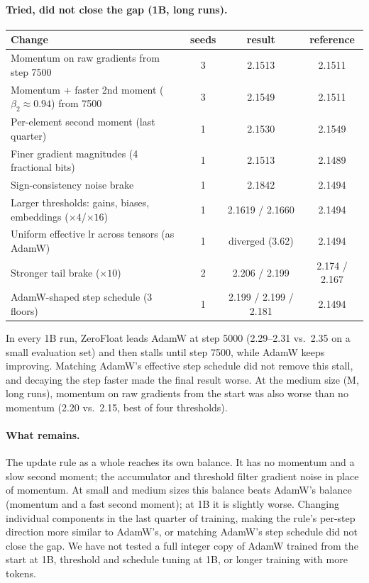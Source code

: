 \documentclass[11pt]{article}
\begin{document}
\paragraph{Tried, did not close the gap (1B, long runs).}
\begin{center}\small
\begin{tabular}{lccc}\toprule
Change & seeds & result & reference \\\midrule
Momentum on raw gradients from step 7500 & 3 & 2.1513 & 2.1511 \\
Momentum + faster 2nd moment ($\beta_2\!\approx\!0.94$) from 7500 & 3 & 2.1549 & 2.1511 \\
Per-element second moment (last quarter) & 1 & 2.1530 & 2.1549 \\
Finer gradient magnitudes (4 fractional bits) & 1 & 2.1513 & 2.1489 \\
Sign-consistency noise brake & 1 & 2.1842 & 2.1494 \\
Larger thresholds: gains, biases, embeddings ($\times4$/$\times16$) & 1 & 2.1619 / 2.1660 & 2.1494 \\
Uniform effective lr across tensors (as AdamW) & 1 & diverged (3.62) & 2.1494 \\
Stronger tail brake ($\times10$) & 2 & 2.206 / 2.199 & 2.174 / 2.167 \\
AdamW-shaped step schedule (3 floors) & 1 & 2.199 / 2.199 / 2.181 & 2.1494 \\\bottomrule
\end{tabular}
\end{center}
In every 1B run, ZeroFloat leads AdamW at step 5000 (2.29--2.31 vs.\ 2.35 on a small evaluation set) and then stalls until step 7500, while AdamW keeps improving. Matching AdamW's effective step schedule did not remove this stall, and decaying the step faster made the final result worse. At the medium size (M, long runs), momentum on raw gradients from the start was also worse than no momentum (2.20 vs.\ 2.15, best of four thresholds).

\paragraph{What remains.} The update rule as a whole reaches its own balance. It has no momentum and a slow second moment; the accumulator and threshold filter gradient noise in place of momentum. At small and medium sizes this balance beats AdamW's balance (momentum and a fast second moment); at 1B it is slightly worse. Changing individual components in the last quarter of training, making the rule's per-step direction more similar to AdamW's, or matching AdamW's step schedule did not close the gap. We have not tested a full integer copy of AdamW trained from the start at 1B, threshold and schedule tuning at 1B, or longer training with more tokens.
\end{document}
